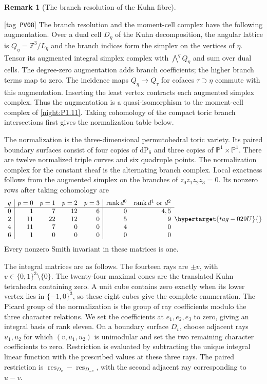 \documentclass[11pt,a4paper]{article}
\numberwithin{equation}{section}
\theoremstyle{definition}
\newtheorem{remark}[remark]{Remark}
\newcommand{\StatementRecord}[4]{{\upshape\footnotesize[tag~\texttt{#3}]}\enspace\ignorespaces}
\begin{document}
\begin{remark}[The branch resolution of the Kuhn fibre]
\hypertarget{tag-PV08}{}\label{pub:V:cusp-branch-resolution}
\StatementRecord{pub:V:cusp-branch-resolution}{proved}{PV08}{}
The branch resolution and the moment-cell complex have the following
augmentation. Over a dual cell $D_\eta$ of the Kuhn decomposition,
the angular lattice is $Q_\eta=\mathbb Z^3/L_\eta$ and the branch
indices form the simplex on the vertices of $\eta$. Tensor its
augmented integral simplex complex with $\bigwedge^qQ_\eta$ and
sum over dual cells. The degree-zero augmentation adds branch
coefficients; the higher branch terms map to zero. The incidence
maps $Q_\eta\to Q_\tau$ for cofaces $\tau\supset\eta$ commute
with this augmentation. Inserting the least vertex contracts each
augmented simplex complex. Thus the augmentation is a
quasi-isomorphism to the moment-cell complex of
\cref{night:P1.11}. Taking cohomology of the compact toric branch
intersections first gives the normalization table below.

The normalization is the three-dimensional permutohedral toric variety.
Its paired boundary surfaces consist of four copies of $\mathrm{dP}_6$
and three copies of $\mathbb P^1\times\mathbb P^1$.  There are twelve
normalized triple curves and six quadruple points.  The normalization
complex for the constant sheaf is the alternating branch complex.
Local exactness follows from the augmented simplex on the branches
of $z_0z_1z_2z_3=0$.  Its nonzero rows after taking cohomology are
\begin{equation}
\begin{array}{c|rrrr|rr}
q& p=0&p=1&p=2&p=3&\operatorname{rank}d^0&
 \operatorname{rank}d^1\ \text{or }d^2\\ \hline
0&1&7&12&6&0&4,5\\
2&11&22&12&0&5&9\\
4&11&7&0&0&4&0\\
6&1&0&0&0&0&0
\end{array}
\hypertarget{tag-029U}{}\label{maps:eq:E.7}
\end{equation}
Every nonzero Smith invariant in these matrices is one.


The integral matrices are as follows.
The fourteen rays are $\pm v$, with
$v\in\{0,1\}^3\setminus\{0\}$.  The twenty-four maximal cones
are the translated Kuhn tetrahedra containing zero.  A unit cube contains zero exactly when its lower vertex lies in
$\{-1,0\}^3$, so these eight cubes give the complete enumeration.  The Picard group of the normalization
is the group of ray coefficients modulo the three character relations.
We set the coefficients at $e_1,e_2,e_3$ to zero, giving an integral
basis of rank eleven.  On a boundary surface $D_v$, choose adjacent
rays $u_1,u_2$ for which $(v,u_1,u_2)$ is unimodular and set the two
remaining character coefficients to zero.  Restriction is evaluated
by subtracting the unique integral linear function with the prescribed
values at these three rays.  The paired restriction is
$\operatorname{res}_{D_v}-\operatorname{res}_{D_{-v}}$, with the
second adjacent ray corresponding to $u-v$.



\end{remark}
\end{document}
